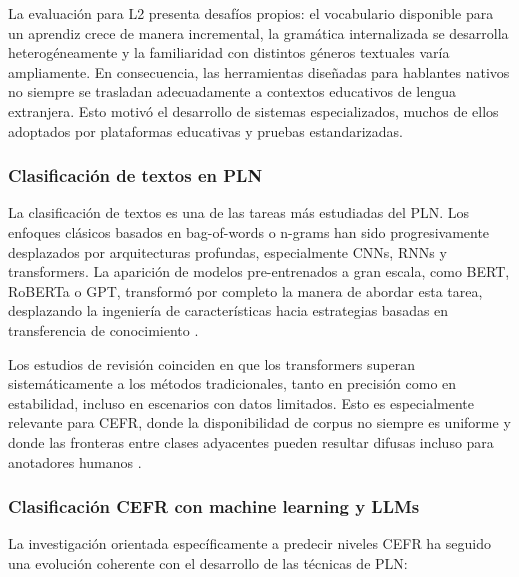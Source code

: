 La evaluación para L2 presenta desafíos propios: el vocabulario disponible para un aprendiz crece de manera incremental, la gramática internalizada se desarrolla heterogéneamente y la familiaridad con distintos géneros textuales varía ampliamente. En consecuencia, las herramientas diseñadas para hablantes nativos no siempre se trasladan adecuadamente a contextos educativos de lengua extranjera. Esto motivó el desarrollo de sistemas especializados, muchos de ellos adoptados por plataformas educativas y pruebas estandarizadas.

\subsubsection*{Clasificación de textos en PLN}
La clasificación de textos es una de las tareas más estudiadas del PLN. Los enfoques clásicos basados en bag-of-words o n-grams han sido progresivamente desplazados por arquitecturas profundas, especialmente CNNs, RNNs y transformers. La aparición de modelos pre-entrenados a gran escala, como BERT, RoBERTa o GPT, transformó por completo la manera de abordar esta tarea, desplazando la ingeniería de características hacia estrategias basadas en transferencia de conocimiento \parencite{Zhou2020, Li2021, benchmark}.

Los estudios de revisión coinciden en que los transformers superan sistemáticamente a los métodos tradicionales, tanto en precisión como en estabilidad, incluso en escenarios con datos limitados. Esto es especialmente relevante para CEFR, donde la disponibilidad de corpus no siempre es uniforme y donde las fronteras entre clases adyacentes pueden resultar difusas incluso para anotadores humanos \parencite{Kerz2021, Wisniewski2017}.

\subsubsection*{Clasificación CEFR con machine learning y LLMs}

La investigación orientada específicamente a predecir niveles CEFR ha seguido una evolución coherente con el desarrollo de las técnicas de PLN:

